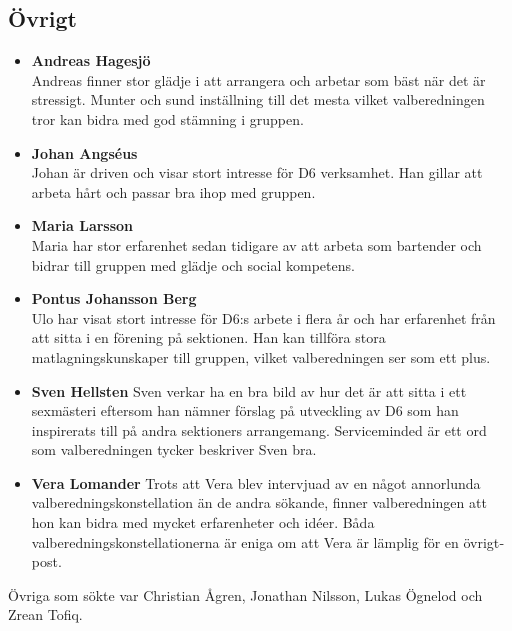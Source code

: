 \subsection{Övrigt}
\begin{autoframe}
\scriptsize
\begin{multicols}{2}
\begin{itemize}
\item \textbf{Andreas Hagesjö} \\
Andreas finner stor glädje i att arrangera och arbetar som bäst när det är stressigt. Munter och
sund inställning till det mesta vilket valberedningen tror kan bidra med god stämning i gruppen.

\item \textbf{Johan Angséus} \\
Johan är driven och visar stort intresse för D6 verksamhet. Han gillar att arbeta hårt och passar
bra ihop med gruppen.

\item \textbf{Maria Larsson} \\
Maria har stor erfarenhet sedan tidigare av att arbeta som bartender och bidrar till gruppen med
glädje och social kompetens.

\item \textbf{Pontus Johansson Berg} \\
Ulo har visat stort intresse för D6:s arbete i flera år och har erfarenhet från att sitta i en förening på sektionen. Han kan tillföra stora matlagningskunskaper till gruppen, vilket valberedningen ser som ett plus.

\item \textbf{Sven Hellsten}
Sven verkar ha en bra bild av hur det är att sitta i ett sexmästeri eftersom han nämner förslag på
utveckling av D6 som han inspirerats till på andra sektioners arrangemang. Service­minded är
ett ord som valberedningen tycker beskriver Sven bra.


\item \textbf{Vera Lomander}
Trots att Vera blev intervjuad av en något annorlunda valberedningskonstellation än de andra sökande, finner valberedningen att hon kan bidra med mycket erfarenheter och idéer.
Båda valberedningskonstellationerna är eniga om att Vera är lämplig för en övrigt­post.
\end{itemize}
\end{multicols}
Övriga som sökte var Christian Ågren, Jonathan Nilsson, Lukas Ögnelod och Zrean Tofiq.
\end{autoframe}
